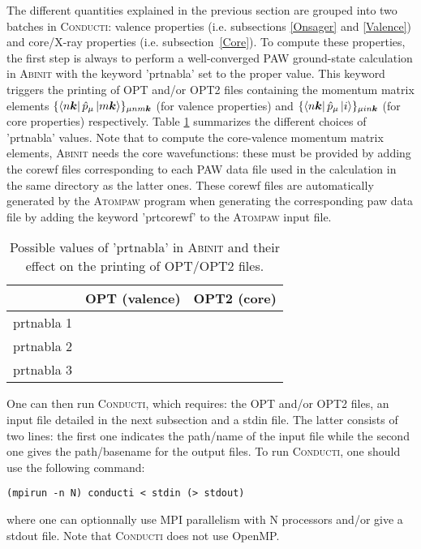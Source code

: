 \documentclass[a4,12pts]{extarticle}
\newcommand{\cmark}{\ding{51}}%
\newcommand{\xmark}{\ding{55}}%
\begin{document}
The different quantities explained in the previous section are grouped into two batches in \textsc{Conducti}: valence properties (i.e. subsections \ref{Onsager} and \ref{Valence}) and core/X-ray properties (i.e. subsection~\ref{Core}). 
To compute these properties, the first step is always to perform a well-converged PAW ground-state calculation in \textsc{Abinit} with the keyword 'prtnabla' set to the proper value. This keyword triggers the printing of OPT and/or OPT2 files containing the momentum matrix elements  $\{\bra{n\boldsymbol{k}}\hat{p}_{\mu}\ket{m\boldsymbol{k}}\}_{\mu nm\boldsymbol{k}}$ (for valence properties) and $\{\bra{n\boldsymbol{k}}\hat{p}_{\mu}\ket{i}\}_{\mu in\boldsymbol{k}}$ (for core properties) respectively. Table \ref{table_prtnabla} summarizes the different choices of 'prtnabla' values. Note that to compute the core-valence momentum matrix elements, \textsc{Abinit} needs the core wavefunctions: these must be provided by adding the corewf files  corresponding to each PAW data file used in the calculation in the same directory as the latter ones. These corewf files are automatically generated by the \textsc{Atompaw} \cite{Holzwarth2001} program when generating the corresponding paw data file by adding the keyword 'prtcorewf' to the \textsc{Atompaw} input file.


\begin{table}[h!]
\centering
\begin{tabular}{l| c c} 
\hline
\hline
 & OPT (valence) & OPT2 (core) \\
\hline
prtnabla 1 &\cmark & \xmark\\
prtnabla 2 &\cmark & \cmark\\
prtnabla 3 &\xmark & \cmark\\
\hline
\hline
\end{tabular}
\caption{Possible values of 'prtnabla' in \textsc{Abinit} and their effect on the printing of OPT/OPT2 files.}\label{table_prtnabla}
\end{table}

One can then run \textsc{Conducti}, which requires: the OPT and/or OPT2 files, an input file detailed in the next subsection and a stdin file. The latter consists of two lines: the first one indicates the path/name of the input file while the second one gives the path/basename for the output files. To run \textsc{Conducti}, one should use the following command:
\begin{verbatim}
(mpirun -n N) conducti < stdin (> stdout)
\end{verbatim}
where one can optionnally use MPI parallelism with N processors and/or give a stdout file. Note that \textsc{Conducti} does not use OpenMP.\\
\end{document}
